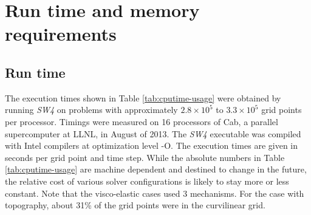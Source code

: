 \documentclass[11pt]{report}
\begin{document}
{%
\chapter{Run time and memory requirements }\label{sec:performance}

\section{Run time}

The execution times shown in Table \ref{tab:cputime-usage} were obtained by running \emph{SW4} on
problems with approximately $2.8\times 10^5$ to $3.3\times 10^5$ grid points per processor. Timings
were measured on 16 processors of Cab, a parallel supercomputer at LLNL, in August of 2013. The
\emph{SW4} executable was compiled with Intel compilers at optimization level -O. The execution
times are given in seconds per grid point and time step.  While the absolute numbers in Table
\ref{tab:cputime-usage} are machine dependent and destined to change in the future, the relative
cost of various solver configurations is likely to stay more or less constant. Note that the
visco-elastic cases used 3 mechanisms. For the case with topography, about 31\% of the grid points
were in the curvilinear grid.

}
\end{document}
